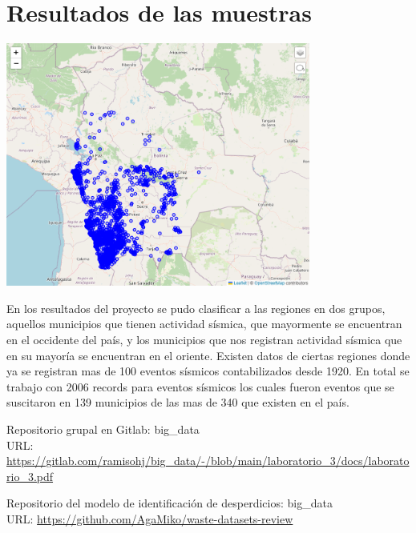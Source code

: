 \documentclass[12pt]{article}
\begin{document}
\section{Resultados de las muestras}

\begin{center}
  \includegraphics[width=10cm]{bolivia_eq2}
\end{center}

En los resultados del proyecto se pudo clasificar a las regiones en dos grupos, aquellos municipios que tienen actividad sísmica, que mayormente se encuentran en el occidente del país, y los municipios que nos registran actividad sísmica que en su mayoría se encuentran en el oriente.
Existen datos de ciertas regiones donde ya se registran mas de 100 eventos sísmicos contabilizados desde 1920. En total se trabajo con 2006 records para eventos sísmicos los cuales fueron eventos que se suscitaron en 139 municipios de las mas de 340 que existen en el país.







\begin{thebibliography}{00}

 Repositorio grupal en Gitlab: big\_data\\
URL: {\url{https://gitlab.com/ramisohj/big_data/-/blob/main/laboratorio_3/docs/laboratorio_3.pdf}}

 Repositorio del modelo de identificación de desperdicios: big\_data\\
URL: {\url{https://github.com/AgaMiko/waste-datasets-review}}
\end{thebibliography}
\end{document}
